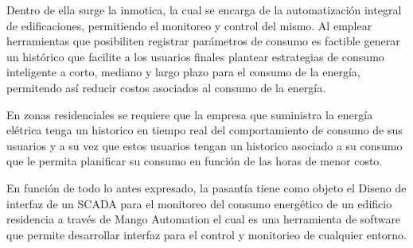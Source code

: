     Dentro de ella surge la inmotica, la cual se encarga de la automatización integral de
    edificaciones, permitiendo el monitoreo y control del mismo. Al emplear herramientas que posibiliten registrar parámetros de consumo es     factible generar un histórico que facilite a los usuarios finales plantear estrategias de consumo inteligente a corto, mediano y largo plazo para el consumo de la energía, permitendo así reducir costos asociados al consumo de la energía.
    

    En zonas residenciales se requiere que la empresa que suministra la energía elétrica tenga un historico en tiempo real 
    del comportamiento de consumo de sus usuarios y a su vez que estos usuarios tengan un historico asociado a su consumo 
    que le permita planificar su consumo en función de las horas de menor costo. 
    
        
    En función de todo lo antes expresado, la pasantía tiene como objeto el Diseno de interfaz de un SCADA para el monitoreo del consumo energético de un edificio residencia a través de Mango Automation el cual es una herramienta de software que permite desarrollar interfaz para el control y monitorieo de cualquier entorno. 
     
